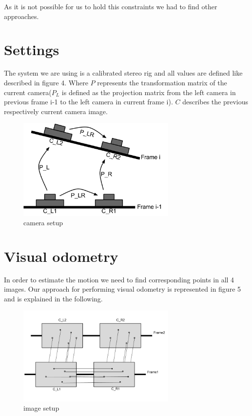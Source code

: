 \documentclass[11pt]{article}
\begin{document}
	As it is not possible for us to hold this constraints we had to find other approaches.

	\section{Settings}
The system we are using is a calibrated stereo rig \cite{malik-hiller-2015} and all values are defined like described in figure 4. Where $P$ represents the transformation matrix of the current camera($P_L$ is defined as the projection matrix from the left camera in previous frame i-1 to the left camera in current frame i). $C$ describes the previous respectively current camera image.
	
	\begin{figure}[H]
		\centering
		\includegraphics[width=0.7\textwidth]{images/camera_setup.png}
		\caption{camera setup}
	\end{figure}
	
	\newpage
	
	\section{Visual odometry}
	In order to estimate the motion we need to find corresponding points in all 4 images. Our approach for performing visual odometry is represented in figure 5 and is explained in the following.
	
	\begin{figure}[H]
		\centering
		\includegraphics[width=0.7\textwidth]{images/image_setup.png}
		\caption{image setup}
	\end{figure}
	
\end{document}
